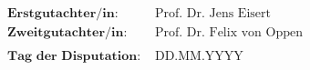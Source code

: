 \thispagestyle{empty}
\begin{align*}
    \textbf{Erstgutachter/in: } &\text{Prof.\ Dr.\ Jens Eisert} \\
    \textbf{Zweitgutachter/in: } &\text{Prof.\ Dr.\ Felix von Oppen} \\
    \\
    \textbf{Tag der Disputation: } &\text{DD.MM.YYYY}
\end{align*}
